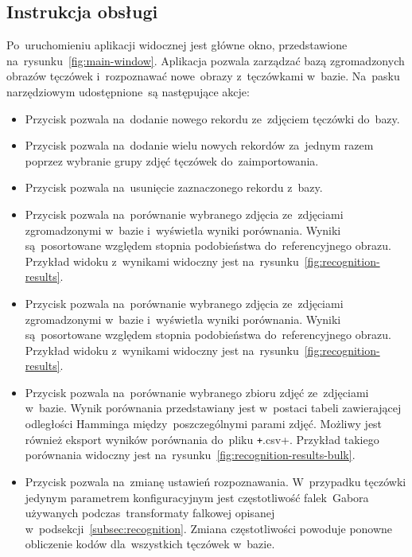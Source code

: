 \documentclass[11pt,a4paper]{article}
\begin{document}
\subsection{Instrukcja obsługi}

Po~uruchomieniu aplikacji widocznej jest główne okno, przedstawione na~rysunku~\ref{fig:main-window}.
Aplikacja pozwala zarządzać bazą zgromadzonych obrazów tęczówek i~rozpoznawać nowe~obrazy z~tęczówkami w~bazie.
Na~pasku narzędziowym udostępnione~są następujące akcje:

\begin{itemize}
    \item Przycisk  pozwala na~dodanie nowego rekordu ze~zdjęciem tęczówki do~bazy.
    \item Przycisk  pozwala na~dodanie wielu nowych rekordów za~jednym razem poprzez wybranie grupy zdjęć tęczówek do~zaimportowania.
    \item Przycisk  pozwala na~usunięcie zaznaczonego rekordu z~bazy.
    \item Przycisk  pozwala na~porównanie wybranego zdjęcia ze~zdjęciami zgromadzonymi w~bazie i~wyświetla wyniki porównania.
    Wyniki są~posortowane względem stopnia podobieństwa do~referencyjnego obrazu.
    Przykład widoku z~wynikami widoczny jest na~rysunku~\ref{fig:recognition-results}.
    \item Przycisk  pozwala na~porównanie wybranego zdjęcia ze~zdjęciami zgromadzonymi w~bazie i~wyświetla wyniki porównania.
    Wyniki są~posortowane względem stopnia podobieństwa do~referencyjnego obrazu.
    Przykład widoku z~wynikami widoczny jest na~rysunku~\ref{fig:recognition-results}.
    \item Przycisk  pozwala na~porównanie wybranego zbioru zdjęć ze~zdjęciami w~bazie.
    Wynik porównania przedstawiany jest w~postaci tabeli zawierającej odległości Hamminga między~poszczególnymi parami zdjęć.
    Możliwy jest również eksport wyników porównania do~pliku \texttt+.csv+.
    Przykład takiego porównania widoczny jest na~rysunku~\ref{fig:recognition-results-bulk}.
    \item Przycisk  pozwala na~zmianę ustawień rozpoznawania.
    W~przypadku tęczówki jedynym parametrem konfiguracyjnym jest częstotliwość falek~Gabora używanych podczas~transformaty falkowej opisanej w~podsekcji~\ref{subsec:recognition}.
    Zmiana częstotliwości powoduje ponowne obliczenie kodów dla~wszystkich tęczówek w~bazie.
\end{itemize}
\end{document}
